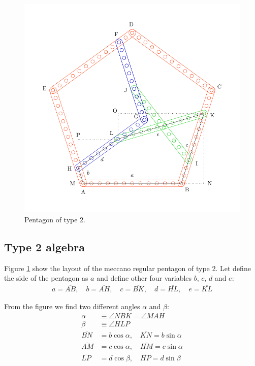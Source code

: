 \documentclass[11pt]{article}
\begin{document}
\begin{figure}[H] %
\centering
\includegraphics[scale=0.75]{types/2}
\caption{Pentagon of type 2.}
\label{fig:type-2}
\end{figure}

\subsection{Type 2 algebra}

Figure \ref{fig:type-2} show the layout of the meccano regular pentagon of type 2.
Let define the side of the pentagon as $a$ and define other four variables $b$, $c$, $d$ and $e$:
\begin{align*}
a = \overline{AB},\quad
b = \overline{AH},\quad
c = \overline{BK},\quad
d = \overline{HL},\quad
e = \overline{KL}
\end{align*}


From the figure we find two different angles $\alpha$ and $\beta$:
\begin{align}
\alpha &\equiv \angle{NBK} = \angle{MAH}\\
\beta  &\equiv \angle{HLP}\\
\overline{BN} &= b\cos{\alpha}, \quad \overline{KN} = b\sin{\alpha}\\
\overline{AM} &= c\cos{\alpha}, \quad \overline{HM} = c\sin{\alpha}\\
\overline{LP} &= d\cos{\beta}, \quad \overline{HP} = d\sin{\beta}
\end{align}
\end{document}
